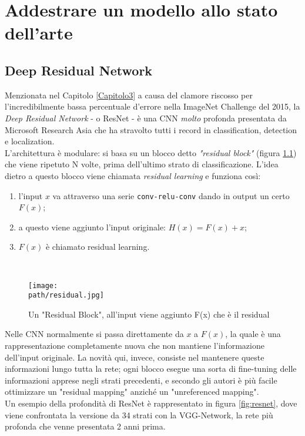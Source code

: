 \chapter{Addestrare un modello allo stato dell'arte} %
\label{Capitolo5} %
\def \path {Figures/C5}
\section{Deep Residual Network}
Menzionata nel Capitolo \ref{Capitolo3} a causa del clamore riscosso per l'incredibilmente bassa percentuale d'errore nella ImageNet Challenge del 2015, la \emph{Deep Residual Network} - o ResNet - è una CNN \emph{molto} profonda presentata da Microsoft Research Asia \parencite{resnet} che ha stravolto tutti i record in classification, detection e localization. 
\\ 
L'architettura è modulare: si basa su un blocco detto \emph{"residual block"} (figura \ref{fig:residual}) che viene ripetuto N volte, prima dell'ultimo strato di classificazione. L'idea dietro a questo blocco viene chiamata \emph{residual learning} e funziona così: 
\begin{enumerate}
\item l'input $x$ va attraverso una serie \texttt{conv-relu-conv} dando in output un certo $F(x)$;
\item a questo viene aggiunto l'input originale: $H(x) = F(x) + x$;
\item $F(x)$ è chiamato residual learning. 
\end{enumerate}\\ 
\begin{figure}[h!]
 \centering
 \texttt{[image: \\path/residual.jpg]} 
 \caption{Un "Residual Block", all'input viene aggiunto F(x) che è il residual}
 \label{fig:residual}
\end{figure}

Nelle CNN normalmente si passa direttamente da $x$ a $F(x)$, la quale è una rappresentazione completamente nuova che non mantiene l'informazione dell'input originale. La novità qui, invece, consiste nel mantenere queste informazioni lungo tutta la rete; ogni blocco esegue una sorta di fine-tuning delle informazioni apprese negli strati precedenti, e secondo gli autori è più facile ottimizzare un "residual mapping" anziché un "unreferenced mapping". 
\\
Un esempio della profondità di ResNet è rappresentato in figura \ref{fig:resnet}, dove viene confrontata la versione da 34 strati con la VGG-Network, la rete più profonda che venne presentata 2 anni prima. 
\newpage 

